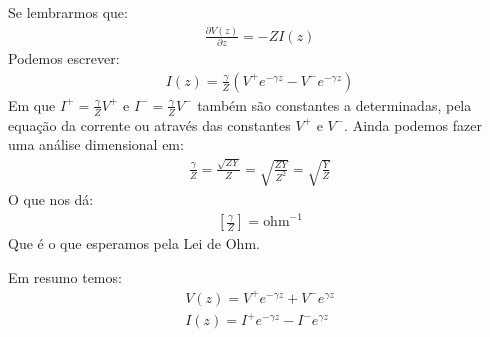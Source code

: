 \documentclass[11pt,a4paper]{article}
\begin{document}
  Se lembrarmos que:
  \begin{align*}
    \frac{\partial V(z)}{\partial z} = -Z I(z)
  \end{align*}
  Podemos escrever:
  \begin{align*}
    I(z) = \frac{\gamma}{Z} (V^+ e^{-\gamma z} - V^- e^{-\gamma z})
  \end{align*}
  Em que $I^+ = \frac{\gamma }{Z} V^+$ e $I^- = \frac{\gamma}{Z}V^-$ também são constantes a determinadas, pela equação da corrente ou através das constantes $V^+$ e $V^-$. Ainda podemos fazer uma análise dimensional em:
  \begin{align*}
    \frac{\gamma}{Z} = \frac{\sqrt{ZY}}{Z}= \sqrt{\frac{ZY}{Z^2}}= \sqrt{\frac{Y}{Z}} 
  \end{align*}
 O que nos dá:
 \begin{align*}
   \left[ \frac{\gamma}{Z} \right]= \text{ohm}^{-1}
 \end{align*}
 Que é o que esperamos pela Lei de Ohm.

 Em resumo temos:
 \begin{align*}
 V(z)= V^+ e^{- \gamma z}  + V^- e^{\gamma z} \\
I(z)= I^+ e^{- \gamma z}  - I^- e^{\gamma z} \\
 \end{align*}
\end{document}
